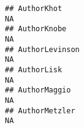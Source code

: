 \documentclass[]{article}
\begin{document}
\begin{verbatim}
## AuthorKhot                                                                                                                                                                                                                                                                                                                                                                                                                                                                            NA
## AuthorKnobe                                                                                                                                                                                                                                                                                                                                                                                                                                                                           NA
## AuthorLevinson                                                                                                                                                                                                                                                                                                                                                                                                                                                                        NA
## AuthorLisk                                                                                                                                                                                                                                                                                                                                                                                                                                                                            NA
## AuthorMaggio                                                                                                                                                                                                                                                                                                                                                                                                                                                                          NA
## AuthorMetzler                                                                                                                                                                                                                                                                                                                                                                                                                                                                         NA

\end{verbatim}
\end{document}
